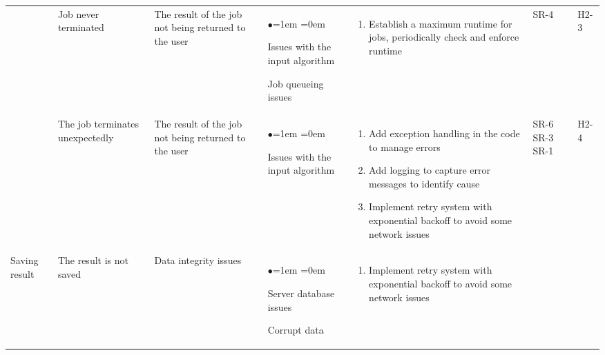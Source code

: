 \documentclass{article}
\begin{document}
\begin{table}[H]
    \centering
    \begin{tabularx}{\textwidth}{|P{2cm}|P{2cm}|P{2cm}|P{2cm}|P{3.45cm}|P{1cm}|P{1cm}|}
        & Job never terminated & The result of the job not being returned to the user & 
        \begin{list}{$\bullet$}{\leftmargin=1em \itemindent=0em}
            \item Issues with the input algorithm
            \item Job queueing issues
        \end{list}
        & 
        \begin{enumerate}[label=(\alph*)]{\leftmargin=1em \itemindent=0em}
            \item Establish a maximum runtime for jobs, periodically check and enforce runtime
        \end{enumerate}
        & SR-4 & H2-3\\
        & The job terminates unexpectedly & The result of the job not being returned to the user & 
        \begin{list}{$\bullet$}{\leftmargin=1em \itemindent=0em}
            \item Issues with the input algorithm
        \end{list}
        & 
        \begin{enumerate}[label=(\alph*)]{\leftmargin=1em \itemindent=0em}
            \item Add exception handling in the code to manage errors
            \item Add logging to capture error messages to identify cause
            \item Implement retry system with exponential backoff to avoid some network issues
        \end{enumerate}
        & SR-6 SR-3 SR-1 & H2-4\\
        \hline
        Saving result & The result is not saved & Data integrity issues & 
        \begin{list}{$\bullet$}{\leftmargin=1em \itemindent=0em}
            \item Server database issues
            \item Corrupt data
        \end{list}
        & 
        \begin{enumerate}[label=(\alph*)]{\leftmargin=1em \itemindent=0em}
            \item Implement retry system with exponential backoff to avoid some network issues

\end{enumerate}
\end{tabularx}
\end{table}
\end{document}
